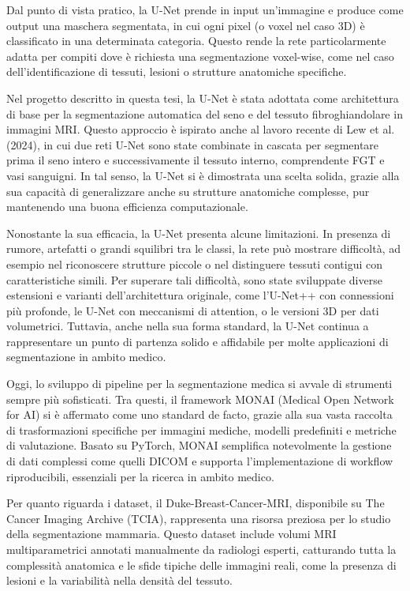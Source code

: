Dal punto di vista pratico, la U-Net prende in input un’immagine e produce come output una maschera segmentata, in cui ogni pixel (o voxel nel caso 3D) è classificato in una determinata categoria. Questo rende la rete particolarmente adatta per compiti dove è richiesta una segmentazione voxel-wise, come nel caso dell’identificazione di tessuti, lesioni o strutture anatomiche specifiche.

Nel progetto descritto in questa tesi, la U-Net è stata adottata come architettura di base per la segmentazione automatica del seno e del tessuto fibroghiandolare in immagini MRI. Questo approccio è ispirato anche al lavoro recente di Lew et al. (2024), in cui due reti U-Net sono state combinate in cascata per segmentare prima il seno intero e successivamente il tessuto interno, comprendente FGT e vasi sanguigni. In tal senso, la U-Net si è dimostrata una scelta solida, grazie alla sua capacità di generalizzare anche su strutture anatomiche complesse, pur mantenendo una buona efficienza computazionale.

Nonostante la sua efficacia, la U-Net presenta alcune limitazioni. In presenza di rumore, artefatti o grandi squilibri tra le classi, la rete può mostrare difficoltà, ad esempio nel riconoscere strutture piccole o nel distinguere tessuti contigui con caratteristiche simili. Per superare tali difficoltà, sono state sviluppate diverse estensioni e varianti dell’architettura originale, come l’U-Net++ con connessioni più profonde, le U-Net con meccanismi di attention, o le versioni 3D per dati volumetrici. Tuttavia, anche nella sua forma standard, la U-Net continua a rappresentare un punto di partenza solido e affidabile per molte applicazioni di segmentazione in ambito medico.




Oggi, lo sviluppo di pipeline per la segmentazione medica si avvale di strumenti sempre più sofisticati. Tra questi, il framework MONAI (Medical Open Network for AI) si è affermato come uno standard de facto, grazie alla sua vasta raccolta di trasformazioni specifiche per immagini mediche, modelli predefiniti e metriche di valutazione. Basato su PyTorch, MONAI semplifica notevolmente la gestione di dati complessi come quelli DICOM e supporta l’implementazione di workflow riproducibili, essenziali per la ricerca in ambito medico.

Per quanto riguarda i dataset, il Duke-Breast-Cancer-MRI, disponibile su The Cancer Imaging Archive (TCIA), rappresenta una risorsa preziosa per lo studio della segmentazione mammaria. Questo dataset include volumi MRI multiparametrici annotati manualmente da radiologi esperti, catturando tutta la complessità anatomica e le sfide tipiche delle immagini reali, come la presenza di lesioni e la variabilità nella densità del tessuto.


